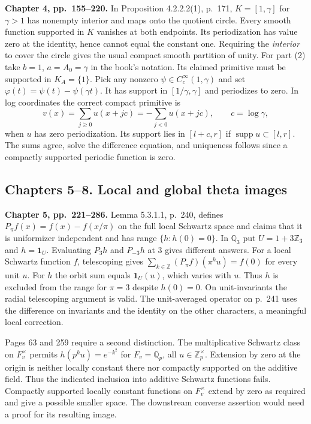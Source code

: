 \documentclass[11pt,letterpaper]{article}
\newcommand{\Q}{\mathbb Q}
\newcommand{\Z}{\mathbb Z}
\newcommand{\supp}{\operatorname{supp}}
\newcommand{\one}{\mathbf 1}
\newcommand{\head}[1]{\par\smallskip\textbf{#1}\enspace}
\begin{document}
\head{Chapter 4, pp.~155--220.} In Proposition 4.2.2.2(1), p.~171, $K=[1,\gamma]$ for $\gamma>1$ has nonempty interior and maps onto the quotient circle. Every smooth function supported in $K$ vanishes at both endpoints. Its periodization has value zero at the identity, hence cannot equal the constant one. Requiring the \emph{interior} to cover the circle gives the usual compact smooth partition of unity. For part (2) take $b=1$, $a=A_0=\gamma$ in the book's notation. Its claimed primitive must be supported in $K_A=\{1\}$. Pick any nonzero $\psi\in C_c^\infty(1,\gamma)$ and set $\varphi(t)=\psi(t)-\psi(\gamma t)$. It has support in $[1/\gamma,\gamma]$ and periodizes to zero. In log coordinates the correct compact primitive is
\[
 v(x)=\sum_{j\ge0}u(x+jc)=-\sum_{j<0}u(x+jc),\qquad c=\log\gamma ,
\]
when $u$ has zero periodization. Its support lies in $[l+c,r]$ if $\supp u\subset[l,r]$. The sums agree, solve the difference equation, and uniqueness follows since a compactly supported periodic function is zero.

\subsection*{Chapters 5--8. Local and global theta images}

\head{Chapter 5, pp.~221--286.} Lemma 5.3.1.1, p.~240, defines $P_\pi f(x)=f(x)-f(x/\pi)$ on the full local Schwartz space and claims that it is uniformizer independent and has range $\{h:h(0)=0\}$. In $\Q_3$ put $U=1+3\Z_3$ and $h=\one_U$. Evaluating $P_3h$ and $P_{-3}h$ at $3$ gives different answers. For a local Schwartz function $f$, telescoping gives $\sum_{k\in\Z}(P_\pi f)(\pi^ku)=f(0)$ for every unit $u$. For $h$ the orbit sum equals $\one_U(u)$, which varies with $u$. Thus $h$ is excluded from the range for $\pi=3$ despite $h(0)=0$. On unit-invariants the radial telescoping argument is valid. The unit-averaged operator on p.~241 uses the difference on invariants and the identity on the other characters, a meaningful local correction.

Pages 63 and 259 require a second distinction. The multiplicative Schwartz class on $F_v^\times$ permits $h(p^k u)=e^{-k^2}$ for $F_v=\Q_p$, all $u\in\Z_p^\times$. Extension by zero at the origin is neither locally constant there nor compactly supported on the additive field. Thus the indicated inclusion into additive Schwartz functions fails. Compactly supported locally constant functions on $F_v^\times$ extend by zero as required and give a possible smaller space. The downstream converse assertion would need a proof for its resulting image.
\end{document}
